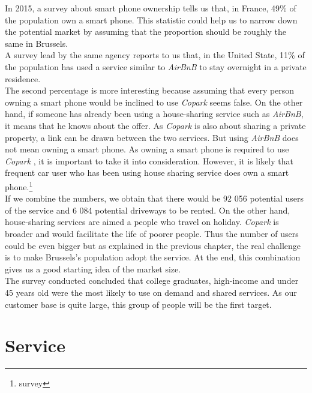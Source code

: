 \documentclass[12pt,a4paper,oneside]{book}
\newcommand{\bp}{\textit{Copark }}
\begin{document}
In 2015, a survey about smart phone ownership tells us that, in France, 49\% of the population own a smart phone.\cite{spown} This statistic could help us to narrow down the potential market by assuming that the proportion should be roughly the same in Brussels.\\
A survey lead by the same agency reports to us that, in the United State, 11\% of the population has used a service similar to \textit{AirBnB} to stay overnight in a private residence.\cite{airbnbuse}\\
The second percentage is more interesting because assuming that every person owning a smart phone would be inclined to use \bp seems false. On the other hand, if someone has already been using a house-sharing service such as \textit{AirBnB}, it means that he knows about the offer. As \bp is also about sharing a private property, a link can be drawn between the two services. But using \textit{AirBnB} does not mean owning a smart phone. As owning a smart phone is required to use \bp, it is important to take it into consideration. However, it is likely that frequent car user who has been using house sharing service does own a smart phone.\footnote{survey}\\

If we combine the numbers, we obtain that there would be 92 056 potential users of the service and 6 084 potential driveways to be rented. On the other hand, house-sharing services are aimed a people who travel on holiday. \bp is broader and would facilitate the life of poorer people. Thus the number of users could be even bigger but as explained in the previous chapter, the real challenge is to make Brussels's population adopt the service. At the end, this combination gives us a good starting idea of the market size.\\

The survey conducted concluded that college graduates, high-income and under 45 years old were the most likely to use on demand and shared services.\cite{airbnbuse} As our customer base is quite large, this group of people will be the first target.

\section{Service}
\end{document}
